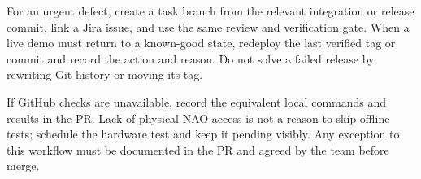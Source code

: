 \documentclass[12pt,a4paper]{article}
\newif\ifshowbibliography
\begin{document}
For an urgent defect, create a task branch from the relevant integration or release commit, link a Jira issue, and use the same review and verification gate. When a live demo must return to a known-good state, redeploy the last verified tag or commit and record the action and reason. Do not solve a failed release by rewriting Git history or moving its tag.

If GitHub checks are unavailable, record the equivalent local commands and results in the PR. Lack of physical NAO access is not a reason to skip offline tests; schedule the hardware test and keep it pending visibly. Any exception to this workflow must be documented in the PR and agreed by the team before merge.

\ifshowbibliography
    \nocite{*}
    \clearpage
    \printbibliography[heading=bibintoc,title={References}]
\fi
\end{document}
